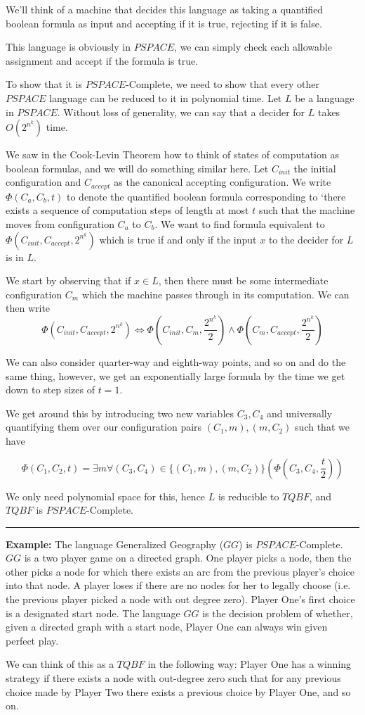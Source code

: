 \documentclass[twoside]{article}
\newenvironment{proof}{{\bf Proof:}}{\hfill\rule{2mm}{2mm}}
\begin{document}
\begin{proof}
	
	We'll think of a machine that decides this language as taking a quantified boolean formula as input and accepting if it is true, rejecting if it is false.
	
	This language is obviously in $PSPACE$, we can simply check each allowable assignment and accept if the formula is true.
	
	To show that it is $PSPACE$-Complete, we need to show that every other $PSPACE$ language can be reduced to it in polynomial time.  Let $L$ be a language in $PSPACE$.  Without loss of generality, we can say that a decider for $L$ takes $O(2^{n^k})$ time. 
	
	We saw in the Cook-Levin Theorem how to think of states of computation as boolean formulas, and we will do something similar here.  Let $C_{init}$ the initial configuration and $C_{accept}$ as the canonical accepting configuration.  We write $\Phi(C_a,C_b,t)$ to denote the quantified boolean formula corresponding to `there exists a sequence of computation steps of length at most $t$ such that the machine moves from configuration $C_a$ to $C_b$.  We want to find formula equivalent to $\Phi(C_{init},C_{accept},2^{n^k})$ which is true if and only if the input $x$ to the decider for $L$ is in $L$.
	
	We start by observing that if $x\in L$, then there must be some intermediate configuration $C_m$ which the machine passes through in its computation.  We can then write \[\Phi(C_{init},C_{accept},2^{n^k}) \iff \Phi(C_{init},C_{m},\frac{2^{n^k}}{2})\land \Phi(C_{m},C_{accept},\frac{2^{n^k}}{2})\]
	
	We can also consider quarter-way and eighth-way points, and so on and do the same thing, however, we get an exponentially large formula by the time we get down to step sizes of $t=1$.
	
	We get around this by introducing two new variables $C_3,C_4$ and universally quantifying them over our configuration pairs $(C_1,m),(m,C_2)$ such that we have 

	\[ \Phi(C_1,C_2,t)=\exists m \forall(C_3,C_4)\in \{ (C_1,m),(m,C_2) \} (\Phi(C_3,C_4,\frac{t}{2})) \]
	
	We only need polynomial space for this, hence $L$ is reducible to $TQBF$, and $TQBF$ is $PSPACE$-Complete.
\end{proof}



\textbf{Example:} The language Generalized Geography ($GG$) is $PSPACE$-Complete.  $GG$ is a two player game on a directed graph.  One player picks a node, then the other picks a node for which there exists an arc from the previous player's choice into that node.  A player loses if there are no nodes for her to legally choose (i.e. the previous player picked a node with out degree zero).  Player One's first choice is a designated start node.  The language $GG$ is the decision problem of whether, given a directed graph with a start node, Player One can always win given perfect play.

We can think of this as a $TQBF$ in the following way:  Player One has a winning strategy if there exists a node with out-degree zero such that for any previous choice made by Player Two there exists a previous choice by Player One, and so on.
\end{document}
